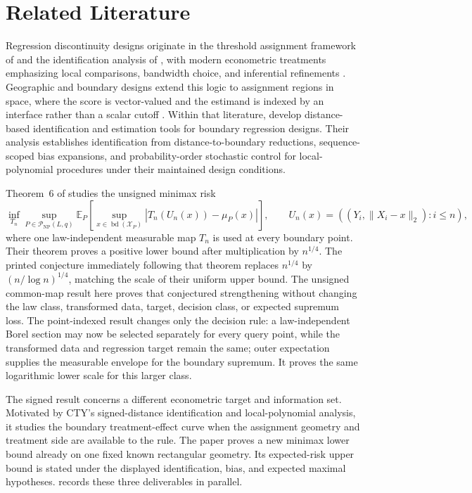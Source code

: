 \section{Related Literature}
\label{sec:related-literature}

Regression discontinuity designs originate in the threshold assignment framework of \citet{Thistlethwaite1960} and the identification analysis of \citet{Hahn2001}, with modern econometric treatments emphasizing local comparisons, bandwidth choice, and inferential refinements \citep{Imbens2008,Lee2010,Imbens2012}. Geographic and boundary designs extend this logic to assignment regions in space, where the score is vector-valued and the estimand is indexed by an interface rather than a scalar cutoff \citep{Keele2015a,Keele2015b,Keele2016,Papay2011,Reardon2012,Wong2013,Choi2018,Diaz2023,Sawada2024,Merlano2025}. Within that literature, \citet{CattaneoTitiunikYu2026Distance} develop distance-based identification and estimation tools for boundary regression designs. Their analysis establishes identification from distance-to-boundary reductions, sequence-scoped bias expansions, and probability-order stochastic control for local-polynomial procedures under their maintained design conditions.

Theorem~6 of \citet{CattaneoTitiunikYu2026Distance} studies the unsigned minimax risk
\[
\inf_{T_n}\sup_{P\in\mathcal P_{\mathrm{NP}}(L,q)}
\mathbb E_P\!\left[\sup_{x\in\operatorname{bd}(\mathcal X_P)}
\left|T_n(U_n(x))-\mu_P(x)\right|\right],
\qquad
U_n(x)=((Y_i,\lVert X_i-x\rVert_2):i\le n),
\]
where one law-independent measurable map \(T_n\) is used at every boundary point. Their theorem proves a positive lower bound after multiplication by \(n^{1/4}\). The printed conjecture immediately following that theorem replaces \(n^{1/4}\) by \((n/\log n)^{1/4}\), matching the scale of their uniform upper bound. The unsigned common-map result here proves that conjectured strengthening without changing the law class, transformed data, target, decision class, or expected supremum loss. The point-indexed result changes only the decision rule: a law-independent Borel section may now be selected separately for every query point, while the transformed data and regression target remain the same; outer expectation supplies the measurable envelope for the boundary supremum. It proves the same logarithmic lower scale for this larger class.

The signed result concerns a different econometric target and information set. Motivated by CTY's signed-distance identification and local-polynomial analysis, it studies the boundary treatment-effect curve when the assignment geometry and treatment side are available to the rule. The paper proves a new minimax lower bound already on one fixed known rectangular geometry. Its expected-risk upper bound is stated under the displayed identification, bias, and expected maximal hypotheses.  records these three deliverables in parallel.

